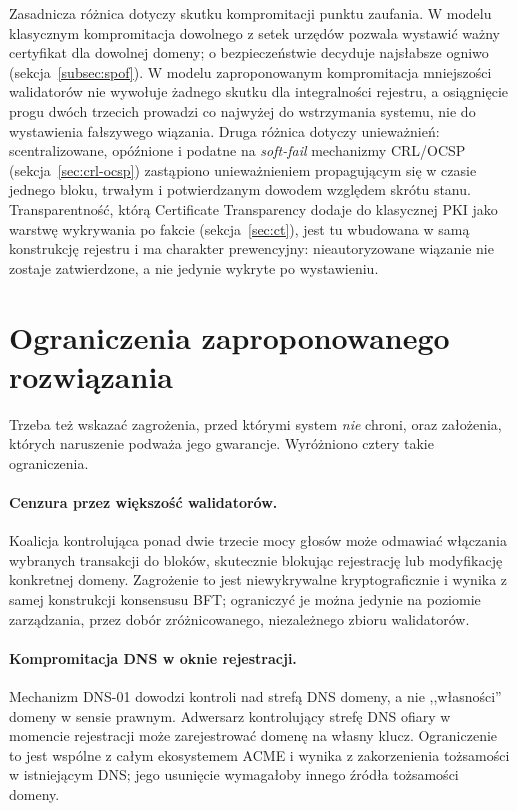 Zasadnicza różnica dotyczy skutku kompromitacji punktu zaufania. W modelu klasycznym kompromitacja dowolnego z setek urzędów pozwala wystawić ważny certyfikat dla dowolnej domeny; o bezpieczeństwie decyduje najsłabsze ogniwo (sekcja~\ref{subsec:spof}). W modelu zaproponowanym kompromitacja mniejszości walidatorów nie wywołuje żadnego skutku dla integralności rejestru, a osiągnięcie progu dwóch trzecich prowadzi co najwyżej do wstrzymania systemu, nie do wystawienia fałszywego wiązania. Druga różnica dotyczy unieważnień: scentralizowane, opóźnione i podatne na \emph{soft-fail} mechanizmy CRL/OCSP (sekcja~\ref{sec:crl-ocsp}) zastąpiono unieważnieniem propagującym się w czasie jednego bloku, trwałym i potwierdzanym dowodem względem skrótu stanu. Transparentność, którą Certificate Transparency dodaje do klasycznej PKI jako warstwę wykrywania po fakcie (sekcja~\ref{sec:ct}), jest tu wbudowana w samą konstrukcję rejestru i ma charakter prewencyjny: nieautoryzowane wiązanie nie zostaje zatwierdzone, a nie jedynie wykryte po wystawieniu.

\section{Ograniczenia zaproponowanego rozwiązania}
\label{sec:ograniczenia}

Trzeba też wskazać zagrożenia, przed którymi system \emph{nie} chroni, oraz założenia, których naruszenie podważa jego gwarancje. Wyróżniono cztery takie ograniczenia.

\paragraph{Cenzura przez większość walidatorów.} Koalicja kontrolująca ponad dwie trzecie mocy głosów może odmawiać włączania wybranych transakcji do bloków, skutecznie blokując rejestrację lub modyfikację konkretnej domeny. Zagrożenie to jest niewykrywalne kryptograficznie i wynika z samej konstrukcji konsensusu BFT; ograniczyć je można jedynie na poziomie zarządzania, przez dobór zróżnicowanego, niezależnego zbioru walidatorów.

\paragraph{Kompromitacja DNS w oknie rejestracji.} Mechanizm DNS-01 dowodzi kontroli nad strefą DNS domeny, a nie ,,własności'' domeny w sensie prawnym. Adwersarz kontrolujący strefę DNS ofiary w momencie rejestracji może zarejestrować domenę na własny klucz. Ograniczenie to jest wspólne z całym ekosystemem ACME i wynika z zakorzenienia tożsamości w istniejącym DNS; jego usunięcie wymagałoby innego źródła tożsamości domeny.

